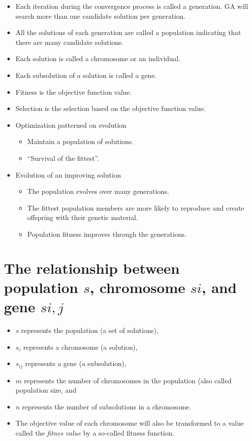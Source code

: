 \documentclass[
  letterpaper,
  DIV=11,
  numbers=noendperiod]{scrreprt}
\providecommand{\tightlist}{%
  \setlength{\itemsep}{0pt}\setlength{\parskip}{0pt}}\usepackage{longtable,booktabs,array}
\begin{document}
\begin{itemize}
\item
  Each iteration during the convergence process is called a generation.
  GA will search more than one candidate solution per generation.
\item
  All the solutions of each generation are called a population
  indicating that there are many candidate solutions.
\item
  Each solution is called a chromosome or an individual.
\item
  Each subsolution of a solution is called a gene.
\item
  Fitness is the objective function value.
\item
  Selection is the selection based on the objective function value.
\item
  Optimization patterned on evolution

  \begin{itemize}
  \tightlist
  \item
    Maintain a population of solutions.
  \item
    ``Survival of the fittest''.
  \end{itemize}
\item
  Evolution of an improving solution

  \begin{itemize}
  \tightlist
  \item
    The population evolves over many generations.
  \item
    The fittest population members are more likely to reproduce and
    create offspring with their genetic material.
  \item
    Population fitness improves through the generations.
  \end{itemize}
\end{itemize}

\section{\texorpdfstring{The relationship between population \(s\),
chromosome \(si\), and gene
\(si,j\)}{The relationship between population s, chromosome si, and gene si,j}}\label{the-relationship-between-population-s-chromosome-si-and-gene-sij}

\begin{itemize}
\tightlist
\item
  \(s\) represents the population (a set of solutions),
\item
  \(s_i\) represents a chromosome (a solution),
\item
  \(s_{ij}\) represents a gene (a subsolution),
\item
  \(m\) represents the number of chromosomes in the population (also
  called population size, and
\item
  \(n\) represents the number of subsolutions in a chromosome.
\item
  The objective value of each chromosome will also be transformed to a
  value called the \emph{fitnes value} by a so-called fitness function.
\end{itemize}
\end{document}
